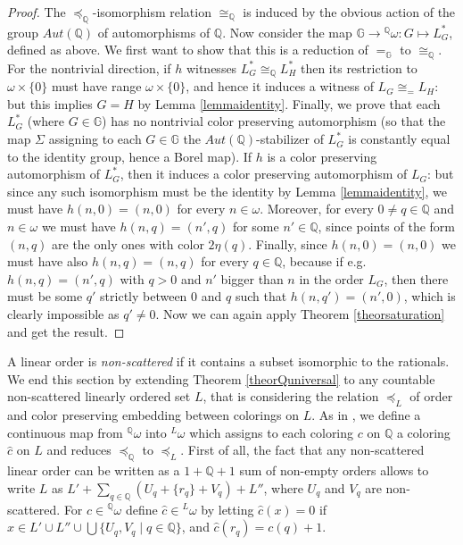 \documentclass{amsart}
\theoremstyle{definition}
\theoremstyle{remark}
\begin{document}
\begin{proof}
The $\preceq_{\mathbb{Q}}$-isomorphism relation $\cong_{\mathbb{Q}}$ is induced by
the obvious action of the group $Aut({\mathbb{Q}})$ of automorphisms of ${\mathbb{Q}}$.
Now consider the map ${\mathbb{G}} \to {}^{\mathbb{Q}} \omega \colon G \mapsto L_G^*$,
defined as above. We first want to show that this is a reduction of
$=_{\mathbb{G}}$ to $\cong_{\mathbb{Q}}$. For the nontrivial direction, if $h$
witnesses $L_G^* \cong_{\mathbb{Q}} L_H^*$ then its restriction to $\omega
\times \{0\}$ must have range $\omega \times \{ 0 \}$, and hence it
induces a witness of $L_G \cong_= L_H$: but this implies $G = H$ by
Lemma \ref{lemmaidentity}. Finally, we prove that each $L_G^*$ (where
$G \in {\mathbb{G}}$) has no nontrivial color preserving automorphism (so that
the map $\Sigma$ assigning to each $G \in {\mathbb{G}}$ the $Aut({\mathbb{Q}})$-stabilizer
of $L_G^*$ is constantly equal to the identity group, hence a Borel
map). If $h$ is a color preserving automorphism of $L_G^*$, then it
induces a color preserving automorphism of $L_G$: but since any such
isomorphism must be the identity by Lemma \ref{lemmaidentity}, we must
have $h(n,0) = (n,0)$ for every $n \in \omega$. Moreover, for every $0
\neq q \in {\mathbb{Q}}$ and $n \in \omega$ we must have $h(n,q) = (n',q)$ for
some $n' \in {\mathbb{Q}}$, since points of the form $(n,q)$ are the only ones
with color $2 \eta(q)$. Finally, since $h(n,0) = (n,0)$ we must have
also $h(n,q) = (n,q)$ for every $q \in {\mathbb{Q}}$, because if e.g.\  $h(n,q)
= (n',q)$ with $q > 0$ and $n'$ bigger than $n$ in the order $L_G$,
then there must be some $q'$ strictly  between $0$ and $q$ such that
$h(n,q') = (n',0)$, which is clearly impossible as $q' \neq 0$. Now we
can again apply Theorem \ref{theorsaturation} and get the result.
\end{proof}

A linear order is \emph{non-scattered} if it contains a subset isomorphic to the rationals.
We end this section by extending Theorem \ref{theorQuniversal} to any countable non-scattered linearly ordered set $L$, that is considering the relation $\preceq_L$ of order and color
preserving embedding between colorings on $L$. As in \cite[Corollary 4]{Camerlo}, we define a continuous map from ${}^{\mathbb{Q}}
\omega$ into ${}^L \omega$ which assigns to each coloring $c$ on ${\mathbb{Q}}$ a
coloring $\hat{c}$ on $L$ and reduces $\preceq_{\mathbb{Q}}$ to
$\preceq_L$. First of all, the fact that any non-scattered linear order can be written as a $1+ {\mathbb{Q}} +1$ sum of non-empty orders allows to write $L$ as $L' + \sum_{q
  \in {\mathbb{Q}}} (U_q + \{ r_q \} + V_q) + L''$, where $U_q$ and $V_q$ are
non-scattered. For $c \in {}^{\mathbb{Q}} \omega$ define $\hat{c} \in {}^L
\omega$ by letting $\hat{c}(x) = 0$ if $x \in L' \cup L'' \cup \bigcup
\{ U_q, V_q \mid q \in {\mathbb{Q}}\}$, and $\hat{c}(r_q) = c(q) + 1$.
\end{document}
